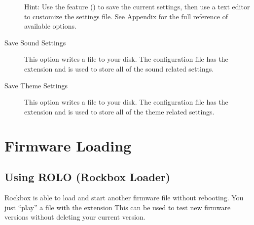 \begin{description}
  Hint: Use the  feature () to save the current settings, then 
  use a text editor to customize the settings file. See Appendix 
   for the full reference of available 
  options.
  
\item [Save Sound Settings]This option writes a  file to 
  your \daps{} disk. The configuration file has the  
  extension and is used to store all of the sound related settings.
    
\item [Save Theme Settings]This option writes a  file to 
  your \daps{} disk. The configuration file has the  
  extension and is used to store all of the theme related settings.

\end{description}

\section{\label{ref:FirmwareLoading}Firmware Loading}

\subsection{\label{ref:using_rolo}Using ROLO (Rockbox Loader)}
Rockbox is able to load and start another firmware file without rebooting. 
You just ``play'' a file with the extension %
This can be used to test new firmware versions without deleting your
current version.


